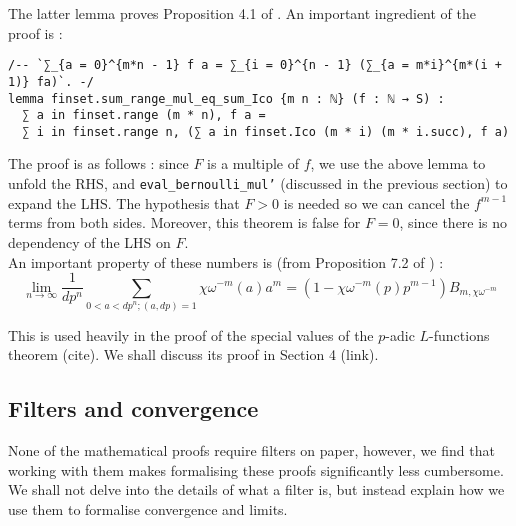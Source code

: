 \documentclass[a4paper,UKenglish,cleveref, autoref, thm-restate]{lipics-v2021}
\newcommand{\lean}[1]{\texttt{#1}\xspace} %
\begin{document}
The latter lemma proves Proposition 4.1 of \cite{cyc}. An important ingredient of the proof is : 
\begin{lstlisting}
/-- `∑_{a = 0}^{m*n - 1} f a = ∑_{i = 0}^{n - 1} (∑_{a = m*i}^{m*(i + 1)} fa)`. -/
lemma finset.sum_range_mul_eq_sum_Ico {m n : ℕ} (f : ℕ → S) :
  ∑ a in finset.range (m * n), f a =
  ∑ i in finset.range n, (∑ a in finset.Ico (m * i) (m * i.succ), f a) 
\end{lstlisting}

The proof is as follows : since $F$ is a multiple of $f$, we use the above lemma to unfold the RHS, 
and \lean{eval\_bernoulli\_mul'} (discussed in the previous section) to expand the LHS. The hypothesis 
that $F > 0$ is needed so we can cancel the $f^{m - 1}$ terms from both sides. Moreover, this theorem is 
false for $F = 0$, since there is no dependency of the LHS on $F$. \\

An important property of these numbers is (from Proposition 7.2 of \cite{cyc}) : 
$$ \lim_{n \to \infty} \frac{1}{dp^{n}} \sum_{0 < a < dp^{n} ; (a, dp) = 1} \chi \omega^{-m} (a) a^{m} = 
  (1 - \chi \omega^{-m} (p) p^{m-1}) B_{m, \chi \omega^{-m}} $$

This is used heavily in the proof of the special values of the $p$-adic $L$-functions theorem (cite). 
We shall discuss its proof in Section 4 (link).

\subsection{Filters and convergence}
None of the mathematical proofs require filters on paper, however, we find that working with them makes 
formalising these proofs significantly less cumbersome. We shall not delve into the details of what a 
filter is, but instead explain how we use them to formalise convergence and limits. \\
\end{document}
